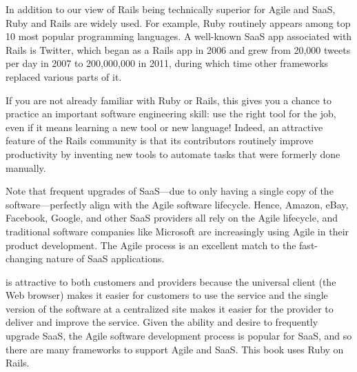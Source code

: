 In addition to our view of Rails being technically superior for Agile
and SaaS, Ruby and Rails are widely used. For example, Ruby routinely
appears among top 10 most popular programming languages. A
well-known SaaS app associated with Rails is Twitter, which began as a Rails app in
2006 and grew from 20,000 tweets per day in 2007 to 200,000,000 in 2011,
during which time other frameworks replaced various parts of it.

If you are not already familiar with Ruby or Rails, this gives you a chance to practice an important
 software engineering skill: use the right tool for the job, even if it means learning a new tool or new language! Indeed, an attractive feature of the Rails community is that its contributors routinely improve productivity by inventing new tools to automate tasks that were formerly done manually.

Note that frequent upgrades of SaaS---due to only having a single copy
of the software---perfectly align with the Agile software
lifecycle. Hence, Amazon, eBay, Facebook, Google,
and other SaaS
providers all rely on the Agile lifecycle, and traditional software
companies like Microsoft are increasingly using Agile in their product
development.
The Agile process is an excellent match to the
fast-changing nature of SaaS applications.

\begin{summary}

  is attractive to both
customers and providers because the universal client (the Web browser) makes it easier for customers to use the service and the single version of the software at a centralized site makes it easier for the provider to deliver and improve the service. Given the ability and desire to frequently upgrade SaaS, the Agile software development process is popular for SaaS, and so there are many frameworks to support Agile and SaaS. This book uses Ruby on Rails.

\end{summary}

